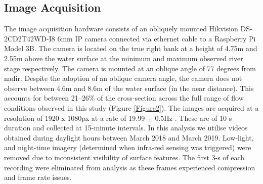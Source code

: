 \documentclass[hess, manuscript]{copernicus}
\begin{document}
\subsection{Image Acquisition}
The image acquisition hardware consists of an obliquely mounted Hikvision DS-2CD2T42WD-I8 6mm IP camera connected via ethernet cable to a Raspberry Pi Model 3B. The camera is located on the true right bank at a height of 4.75m and 2.55m above the water surface at the minimum and maximum observed river stage respectively. The camera is mounted at an oblique angle of 77 degrees from nadir. Despite the adoption of an oblique camera angle, the camera does not observe between 4.6m and 8.6m of the water surface (in the near distance). This accounts for between 21--26\% of the cross-section across the full range of flow conditions observed in this study (Figure \ref{Figure2}). The images are acquired at a resolution of 1920 x 1080px at a rate of 19.99 $\pm$ 0.5Hz \citep[95\% confidence interval;][]{vid_analysis}. These are of 10-s duration and collected at 15-minute intervals. In this analysis we utilise videos obtained during daylight hours between March 2018 and March 2019. Low-light, and night-time imagery (determined when infra-red sensing was triggered) were removed due to inconsistent visibility of surface features. The first 3-s of each recording were eliminated from analysis as these frames experienced compression and frame rate issues.

\begin{figure*}[]
\centering\Large
{} \\
\caption{Schematic illustrating the monitoring station setup and the camera's partial view of the river cross-section. Cross-section data is presented up to the maximum observed river level. Red dashed lines illustrate the camera's field of view. The image presented is an orthophoto produced from footage acquired on 29\textsuperscript{th} December 2018 at 13:00GMT when the flow discharge was $\approx12\textnormal{m\textsuperscript{3} s\textsuperscript{-1}}$, and section averaged flow velocity was $\approx0.54\textnormal{m s\textsuperscript{-1}}$. Vectors represent the direction and velocity of [A] only those features that pass through the cross-section of interest; and [B] all tracked features within the region of interest. Vectors coloured black are trajectories that have been filtered. In the application of theoretical flow field distributions (Figure 2A; Section 2.5.1), surface velocity data is converted to a depth-averaged before being binned into one of 20 equal-width cells enabling the cell-averaged velocity to be obtained. Blue dashes represent the spatial extent of the detected surface features and extrapolation of the flow field is required beyond this extent. The foundation of the velocity index approach (Figure 2B; Section 2.5.2), is that the average surface velocity from across the field of view can be linearly related to the 1-D velocity. }
\label{Figure2} 
\end{figure*}
\end{document}
